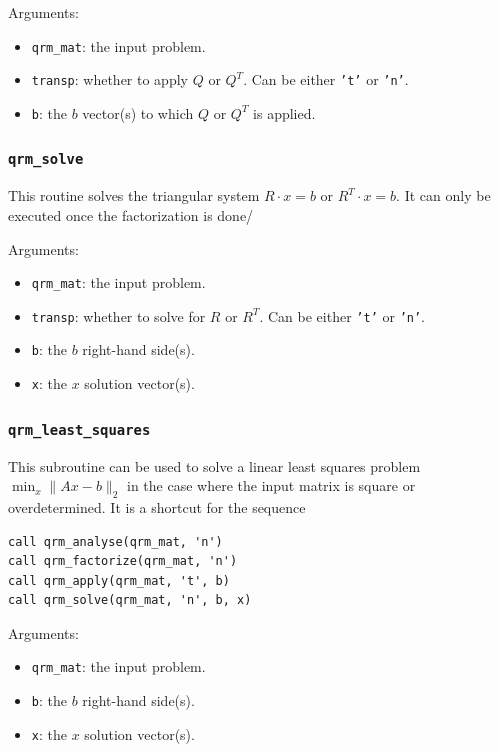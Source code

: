 \documentclass[11pt]{article}
\begin{document}
\noindent Arguments:
\begin{itemize}
\item \texttt{qrm\_mat}: the input problem.
\item \texttt{transp}: whether to apply $Q$ or $Q^T$. Can be either
  \texttt{'t'} or \texttt{'n'}.
\item \texttt{b}: the $b$ vector(s) to which $Q$ or $Q^T$ is
  applied. 
\end{itemize}


\subsubsection{\texttt{qrm\_solve}}
This routine solves the triangular system $R\cdot x = b$ or $R^T\cdot
x =b$. It can only be executed once the factorization is done/


\noindent Arguments:
\begin{itemize}
\item \texttt{qrm\_mat}: the input problem.
\item \texttt{transp}: whether to solve for $R$ or $R^T$. Can be either
  \texttt{'t'} or \texttt{'n'}.
\item \texttt{b}: the $b$ right-hand side(s).
\item \texttt{x}: the $x$ solution vector(s).
\end{itemize}


\subsubsection{\texttt{qrm\_least\_squares}}
This subroutine can be used to solve a linear least squares problem
$\min_x\|Ax-b\|_2$ in the case where the input matrix is square or
overdetermined. It is a shortcut for the sequence
\begin{lstlisting}
call qrm_analyse(qrm_mat, 'n')  
call qrm_factorize(qrm_mat, 'n')  
call qrm_apply(qrm_mat, 't', b)  
call qrm_solve(qrm_mat, 'n', b, x)  
\end{lstlisting}
%

\noindent Arguments:
\begin{itemize}
\item \texttt{qrm\_mat}: the input problem.
\item \texttt{b}: the $b$ right-hand side(s).
\item \texttt{x}: the $x$ solution vector(s).
\end{itemize}
\end{document}
